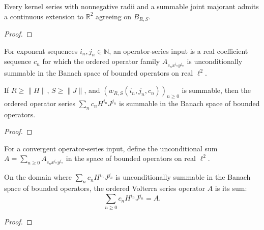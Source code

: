 \begin{supporting}
\begin{theorem}
\label{thm:volterra-series-kernel-extension}
\leanok
Every kernel series with nonnegative radii and a summable joint majorant
admits a continuous extension to $\mathbb R^2$ agreeing on $B_{R,S}$.
\end{theorem}
\begin{proof}
\leanok
\end{proof}

\begin{definition}
\label{def:volterra-operator-series-input}
\leanok
For exponent sequences $i_n,j_n\in\mathbb N$, an operator-series input is
a real coefficient sequence $c_n$ for which the ordered operator family
$A_{c_nx^{i_n}y^{j_n}}$ is unconditionally summable in the Banach space of bounded operators
on real $\ell^2$.
\end{definition}

\begin{theorem}
\label{thm:volterra-operator-series-input}
\leanok
If $R\ge\|H\|$, $S\ge\|J\|$, and
$(w_{R,S}(i_n,j_n,c_n))_{n\ge0}$ is summable, then the ordered operator series $\sum_n c_nH^{i_n}J^{j_n}$ is summable in the Banach space of bounded operators.
\end{theorem}
\begin{proof}
\leanok
\end{proof}

\begin{definition}
\label{def:volterra-series-operator}
\leanok
For a convergent operator-series input, define the unconditional sum
$A=\sum_{n\ge0}A_{c_nx^{i_n}y^{j_n}}$ in the space of bounded operators
on real $\ell^2$.
\end{definition}

\begin{theorem}
\label{thm:volterra-series-operator}
\leanok
On the domain where $\sum_n c_nH^{i_n}J^{j_n}$ is unconditionally summable in the Banach space of bounded operators, the ordered Volterra series operator $A$ is its sum:
\[
 \sum_{n\ge0}c_nH^{i_n}J^{j_n}=A.
\]
\end{theorem}
\begin{proof}
\leanok
\end{proof}



\end{supporting}
